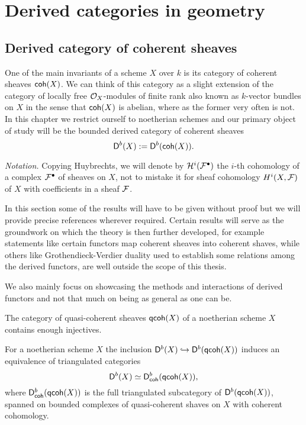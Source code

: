 \section{Derived categories in geometry}
\label{Derived categories in geometry}

\subsection{Derived category of coherent sheaves}
\label{Subsection: Derived category of coherent sheaves}

One of the main invariants of a scheme $X$ over $k$ is its category of coherent sheaves $\mathsf{coh}(X)$. We can think of this category as a slight extension of the category of locally free $\mathcal O_X$-modules of finite rank also known as $k$-vector bundles on $X$ in the sense that $\mathsf{coh}(X)$ is abelian, where as the former very often is not. In this chapter we restrict ourself to noetherian schemes and our primary object of study will be the bounded derived category of coherent sheaves
\[
    \mathsf{D}^b(X) := \mathsf{D}^b(\mathsf{coh}(X)).
\]

\noindent
\textsl{Notation.}
Copying Huybrechts, we will denote by $\mathcal H^i(\mathcal F^\bullet)$ the $i$-th cohomology of a complex $\mathcal F^\bullet$ of sheaves on $X$, not to mistake it for sheaf cohomology $H^{i}(X, \mathcal F)$ of $X$ with coefficients in a sheaf $\mathcal F$.

In this section some of the results will have to be given without proof
but we will provide precise references wherever required. Certain results will serve as the groundwork on which the theory is then further developed, for example statements like certain functors map coherent sheaves into coherent shaves, while others like Grothendieck-Verdier duality used to establish some relations among the derived functors, are well outside the scope of this thesis. 

We also mainly focus on showcasing the methods and interactions of derived functors and not that much on being as general as one can be. 

\begin{proposition}
    The category of quasi-coherent sheaves $\mathsf{qcoh}(X)$ of a noetherian scheme $X$ contains enough injectives.
\end{proposition}

\begin{proposition}
    For a noetherian scheme $X$ the inclusion $\mathsf{D}^b(X) \hookrightarrow \mathsf{D}^b(\mathsf{qcoh}(X))$ induces an equivalence of triangulated categories
    \[
        \mathsf{D}^b(X) \simeq \mathsf{D}^b_{\mathsf{coh}}(\mathsf{qcoh}(X)),
    \]
    where $\mathsf{D}^b_{\mathsf{coh}}(\mathsf{qcoh}(X))$ is the full triangulated subcategory of $\mathsf{D}^b(\mathsf{qcoh}(X))$, spanned on bounded complexes of quasi-coherent shaves on $X$ with coherent cohomology.
\end{proposition}

